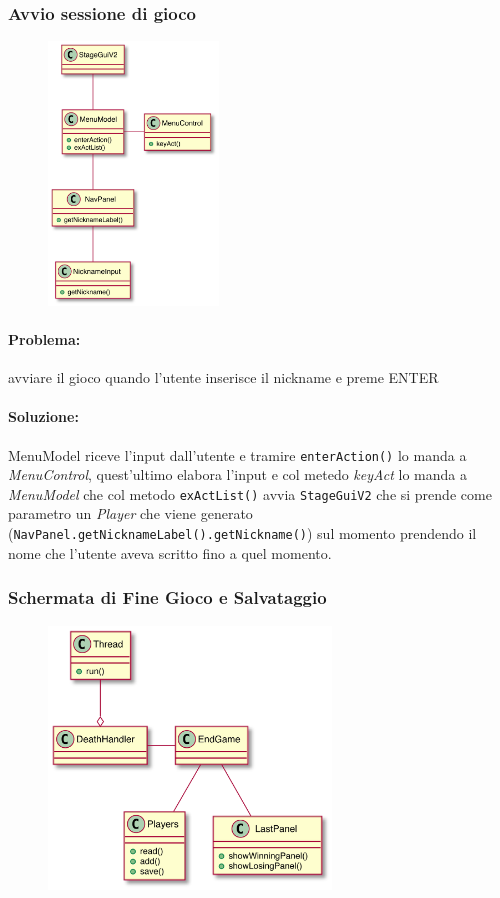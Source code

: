 \documentclass[a4paper,12pt]{report}
\begin{document}
\subsubsection{Avvio sessione di gioco}
    \begin{figure}[H]
    \centering
    \includegraphics[height=7cm]{img/ez/7.png}
\end{figure}
\paragraph{Problema:} avviare il gioco quando l’utente inserisce il nickname e preme ENTER
\paragraph{Soluzione:} MenuModel riceve l’input dall’utente e tramire \texttt{enterAction()} lo manda a \emph{MenuControl}, 
quest’ultimo elabora l’input e col metedo \emph{keyAct} lo manda a \emph{MenuModel} che col metodo \texttt{exActList()} avvia \texttt{StageGuiV2} che si prende come parametro un \emph{Player} che viene generato \\(\texttt{NavPanel.getNicknameLabel().getNickname()}) sul momento prendendo il nome che l’utente aveva scritto fino a quel momento.

\subsubsection{Schermata di Fine Gioco e Salvataggio}
\begin{figure}[H]
    \centering
    \includegraphics[height=7cm]{img/ez/8.png}
\end{figure}
\end{document}
